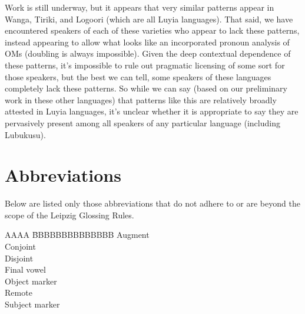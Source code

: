 \documentclass[output=paper]{langscibook}
\begin{document}

Work is still underway, but it appears that very similar patterns appear in Wanga, Tiriki, and Logoori (which are all Luyia languages). That said, we have encountered speakers of each of these varieties who appear to lack these patterns, instead appearing to allow what looks like an incorporated pronoun analysis of OMs (doubling is always impossible). Given the deep contextual dependence of these patterns, it's impossible to rule out pragmatic licensing of some sort for those speakers, but the best we can tell, some speakers of these languages completely lack these patterns. So while we can say (based on our preliminary work in these other languages) that patterns like this are relatively broadly attested in Luyia languages, it's unclear whether it is appropriate to say they are pervasively present among all speakers of any particular language (including Lubukusu).  

\section*{Abbreviations}

Below are listed only those abbreviations that do not adhere to or are beyond the scope of the Leipzig Glossing Rules.

\begin{multicols}{3}
\begin{tabbing}
AAAA    \=BBBBBBBBBBBBBB  \kill
\Aug{}  \>Augment        \\
\Cj{}	\>Conjoint       \\
\Dj{}	\>Disjoint       \\
\Fv{}   \>Final vowel    \\
\Om{}	\>Object marker   \\
\Rem{}	\>Remote	      \\
\Sm{} 	\>Subject marker \\
\end{tabbing}
\end{multicols}
\end{document}
